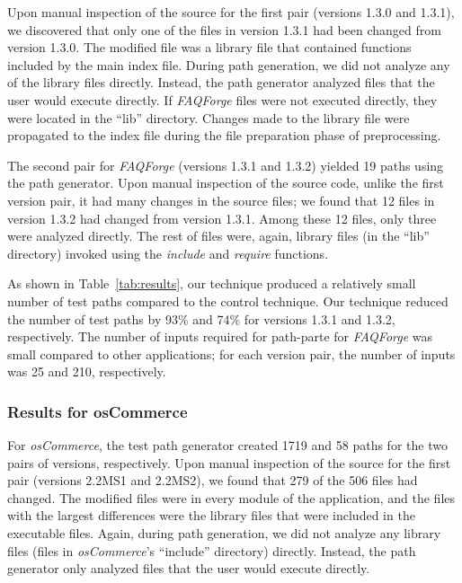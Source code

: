 Upon manual inspection of the source for the first pair (versions 1.3.0 
and 1.3.1), we discovered that only one of the files in version 1.3.1 
had been changed from version 1.3.0. The modified file was 
a library file that contained functions included by the main index file. 
During path generation, we did not analyze any of the library files 
directly. Instead, the path generator analyzed files that the user 
would execute directly. If {\em FAQForge} files
were not executed directly, they were located in the ``lib'' directory.
Changes made to the library file were propagated to the index file 
during the file preparation phase of preprocessing. 

The second pair for {\em FAQForge} (versions 1.3.1 and 1.3.2) yielded
19 paths using the path generator. Upon manual inspection of the source 
code, unlike the first version pair, it had many changes in the
source files; we found that 12 files in version 1.3.2 had changed from 
version 1.3.1.  Among these 12 files, only three were analyzed directly. 
The rest of files were, again, library files (in the ``lib'' directory)
invoked using the \textit{include} and \textit{require} functions.

As shown in Table~\ref{tab:results}, our technique produced a 
relatively small number of test paths compared to the control technique. 
Our technique reduced the number of test paths by 93\% and 74\% 
for versions 1.3.1 and 1.3.2, respectively. 
The number of inputs required for path-parte for {\em FAQForge}
was small compared to other applications; for each version pair,
the number of inputs was 25 and 210, respectively.

\vspace*{-2pt}
\subsubsection{Results for osCommerce}
\vspace*{-2pt}

For {\em osCommerce}, the test path generator created 1719 and 58
paths for the two pairs of versions, respectively. 
Upon manual inspection of the source for the first pair (versions 2.2MS1 
and 2.2MS2), we found that 279 of the 506 files had changed. 
The modified files were in every module of the application, and the files 
with the largest differences were the library files that were included in 
the executable files. Again, during path generation, we did not analyze 
any library files (files in {\em osCommerce}'s ``include'' directory)
directly. Instead, the path generator only analyzed files that the user 
would execute directly. 

